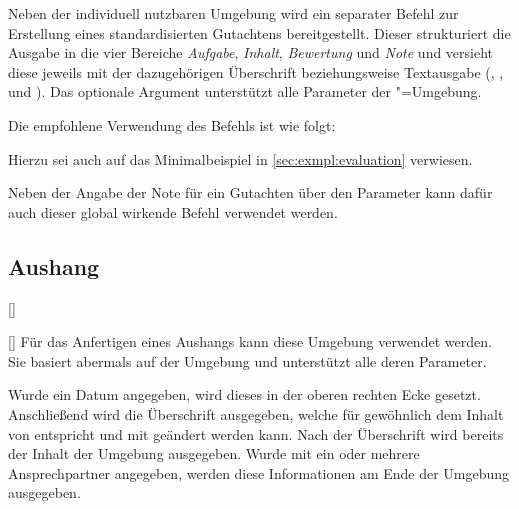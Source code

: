 \begin{Declaration}{\LParameter%
}
\printdeclarationlist%
%
Neben der individuell nutzbaren Umgebung  wird ein 
separater Befehl zur Erstellung eines standardisierten Gutachtens 
bereitgestellt. Dieser strukturiert die Ausgabe in die vier Bereiche 
\emph{Aufgabe}, \emph{Inhalt}, \emph{Bewertung} und \emph{Note} und versieht 
diese jeweils mit der dazugehörigen Überschrift beziehungsweise Textausgabe 
(, ,  und 
). Das optionale Argument unterstützt alle Parameter der 
"=Umgebung.
%
\end{Declaration}
%
\begin{Example}
Die empfohlene Verwendung des Befehls  ist wie folgt:
\begin{Code}[escapechar=§]
\end{Code}
Hierzu sei auch auf das Minimalbeispiel in \autoref{sec:exmpl:evaluation} 
verwiesen.
\end{Example}

\begin{Declaration}{}
\printdeclarationlist%
%
Neben der Angabe der Note für ein Gutachten über den Parameter 
 kann dafür auch dieser global wirkende 
Befehl verwendet werden.
\end{Declaration}


\subsection{Aushang}
\begin{Declaration}{[]}{%
}
\begin{Declaration}{[]}
\printdeclarationlist%
%
%
Für das Anfertigen eines Aushangs kann diese Umgebung verwendet werden. Sie 
basiert abermals auf der Umgebung  und unterstützt alle 
deren Parameter.

Wurde ein Datum angegeben, wird dieses in der oberen rechten Ecke gesetzt. 
Anschließend wird die Überschrift ausgegeben, welche für gewöhnlich dem Inhalt 
von  entspricht und mit  
geändert werden kann. Nach der Überschrift wird bereits der Inhalt der Umgebung 
ausgegeben. Wurde mit  ein oder mehrere Ansprechpartner 
angegeben, werden diese Informationen am Ende der Umgebung ausgegeben.
\end{Declaration}
\end{Declaration}

